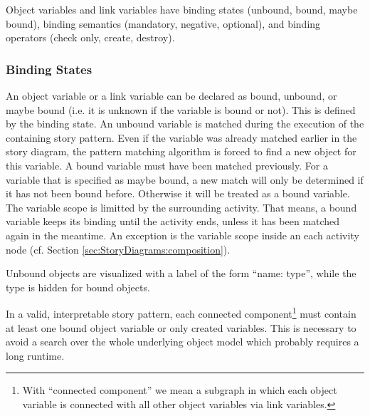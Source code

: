 Object variables and link variables have binding states (unbound, bound, maybe
bound), binding semantics (mandatory, negative, optional), and binding operators
(check only, create, destroy).


\subsubsection{Binding States}
\label{sec:StoryPatterns:binding:states}
An object variable or a link variable can be declared as bound, unbound, or
maybe bound (i.e. it is unknown if the variable is bound or not). This is
defined by the binding state. An unbound variable is matched during the
execution of the containing story pattern. 
Even if the variable was already matched earlier in the story diagram, the
pattern matching algorithm is forced to find a new object for this variable.
A bound variable must have been matched previously. 
For a variable that is specified as maybe bound, a new match will only be
determined if it has not been bound before. 
Otherwise it will be treated as a bound variable.
The variable scope is limitted by the surrounding activity. 
That means, a bound variable keeps its binding until the activity ends, unless
it has been matched again in the meantime.
An exception is the variable scope inside an each activity node (cf. Section
\ref{sec:StoryDiagrams:composition}).

Unbound objects are visualized with a label of the form ``name: type'', while
the type is hidden for bound objects.

In a valid, interpretable story pattern, each connected component\footnote{With
``connected component'' we mean a subgraph in which each object variable is
connected with all other object variables via link variables.}
must contain at least one bound object variable or only created variables. This
is necessary to avoid a search over the whole underlying object model which probably requires a long runtime.


